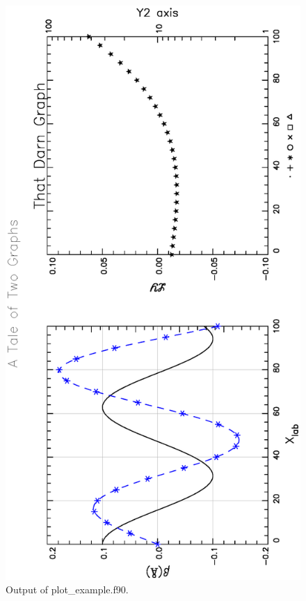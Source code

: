\begin{figure}
\centering
\includegraphics[angle=-90,width=5.5in]{plot-example.eps}
\caption{Output of plot_example.f90.}
\label{f:plot.out}
\end{figure}


